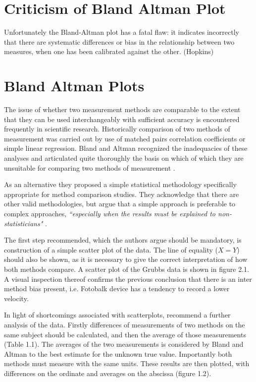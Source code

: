 \documentclass[12pt, a4paper]{report}
\begin{document}
\section{Criticism of Bland Altman Plot}
Unfortunately the Bland-Altman plot has a fatal flaw: it indicates incorrectly that there are systematic differences or bias in the
relationship between two measures, when one has been calibrated against the other. (Hopkins)

\section{Bland Altman Plots}
The issue of whether two measurement methods are comparable to the extent that they can be used interchangeably with sufficient
accuracy is encountered frequently in scientific research. Historically comparison of two methods of measurement was carried
out by use of matched pairs correlation coefficients or simple linear regression. Bland and Altman recognized the inadequacies of
these analyses and articulated quite thoroughly the basis on which of which they are unsuitable for comparing two methods of
measurement \citep*{BA83}.

As an alternative they proposed a simple statistical methodology specifically appropriate for method comparison studies. They
acknowledge that there are other valid methodologies, but argue that a simple approach is preferable to complex approaches,
\emph{``especially when the results must be explained to non-statisticians"} \citep*{BA83}.

The first step recommended, which the authors argue should be mandatory, is construction of a simple scatter plot of the data.
The line of equality ($X=Y$) should also be shown, as it is necessary to give the correct interpretation of how both methods
compare. A scatter plot of the Grubbs data is shown in figure 2.1.
A visual inspection thereof confirms the previous conclusion that there is an inter method bias present, i.e. Fotobalk device has a
tendency to record a lower velocity.


In light of shortcomings associated with scatterplots, \citet*{BA83} recommend a further analysis of the data. Firstly
differences of measurements of two methods on the same subject should  be calculated, and then the average of those measurements
(Table 1.1). The averages of the two measurements is considered by Bland and Altman to the best estimate for the unknown true value.
Importantly both methods must measure with the same units. These  results are then plotted, with differences on the ordinate and
averages on the abscissa (figure 1.2).
\end{document}
